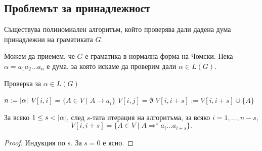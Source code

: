 \subsection{Проблемът за принадлежност}

\begin{thm}
  Съществува полиномиален алгоритъм, който проверява дали дадена дума принадлежни на граматиката $G$.
\end{thm}
Можем да приемем, че $G$ е граматика в нормална форма на Чомски.
Нека $\alpha = a_1a_2\dots a_n$ е дума, за която искаме да проверим дали $\alpha \in L(G)$.
\begin{algorithm}[H]
  \caption{Проверка за $\alpha \in L(G)$}
  \label{alg:belongs-to-grammar}
  \begin{algorithmic}[1]
    \STATE $n := \vert{\alpha}\vert$
    \STATE $V[i,i] = \{A \in V \mid A\rightarrow a_i\}$
    \ENDFOR
    \STATE $V[i,j] = \emptyset$
    \ENDFOR      
    \FORALL[Колко дълъг е интервала]{$s \in [1, n)$}%
    \FORALL[Как разделяме интервала]{$k \in [i, i + s)$}%
    \STATE $V[i,i+s] := V[i,i+s] \cup \{A\}$
    \ENDIF
    \ENDFOR
    \ENDFOR
    \ENDFOR
    \RETURN \TRUE
    \ELSE
    \RETURN \FALSE
    \ENDIF
  \end{algorithmic}
\end{algorithm}

\begin{lemma}
  За всяко $1 \leq s < \vert{\alpha}\vert$, след $s$-тата итерация на алгоритъма, за всяко $i = 1,\dots,n-s$,
  \[V[i,i+s] = \{A \in V \mid A \Rightarrow^\star a_i\dots a_{i+s}\}.\]
\end{lemma}
\begin{proof}
  Индукция по $s$.
  За $s = 0$  е ясно.
\end{proof}




